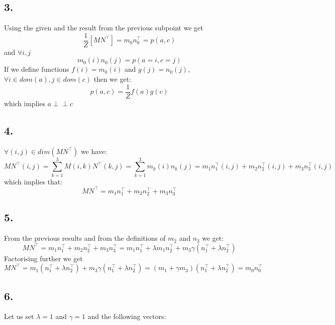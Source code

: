 \documentclass[11pt,a4paper,oneside]{report}
\newcommand\ci{\perp\!\!\!\perp} %
\begin{document}
\subsection*{3.}

Using the given and the result from the previous subpoint we get
\begin{equation}
 \frac{1}{Z}\left[ MN^\top \right] = m_0n_0^\top = p(a, c) 
\end{equation}
and $\forall i,j$
\begin{equation}
 m_0(i)n_0(j) = p(a=i, c=j) 
\end{equation}
If we define functions $f(i)=m_0(i)$ and $g(j)=n_0(j)$, $\forall i \in dom(a), j 
\in dom(c)$ then we get:
$$ p(a,c) = \frac{1}{Z}f(a)g(c)$$ which implies $a \ci c$

\subsection*{4.}

$\forall (i,j) \in dim(MN^\top)$ we have:
$$MN^\top(i,j) = \sum_{k=1}^{3}M(i,k)N^\top(k,j) = \sum_{k=1}^{3} m_k(i)n_k(j) = 
m_1n_1^\top(i,j) + m_2n_2^\top(i,j) + m_3n_3^\top(i,j)$$  
which implies that:
$$ MN^\top = m_1n_1^\top + m_2n_2^\top + m_3n_3^\top$$

\subsection*{5.}

From the previous results and from the definitions of $m_2$ and $n_3$ we get:
$$MN^\top = m_1n_1^\top + m_2n_2^\top + m_3n_3^\top = m_1n_1^\top + \lambda 
m_1n_2^\top + m_3\gamma(n_1^\top + \lambda n_2^\top)$$
Factorising further we get
$$MN^\top = m_1(n_1^\top + \lambda n_2^\top) + m_3\gamma (n_1^\top + \lambda 
n_2^\top) = (m_1 + \gamma m_3)(n_1^\top + \lambda n_2^\top) = m_0n_0^\top$$

\subsection*{6.}

Let us set $\lambda = 1$ and $\gamma = 1$ and the following vectors:
\end{document}
